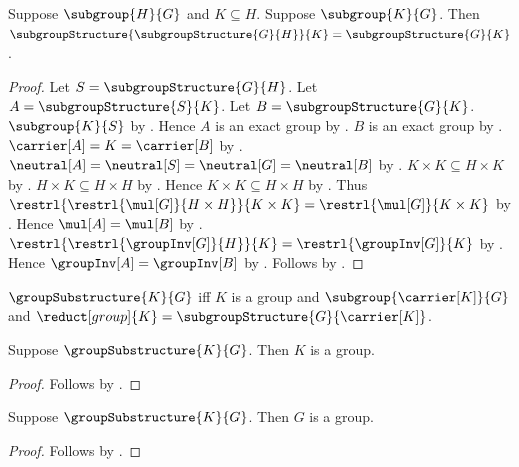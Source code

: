 \begin{theorem}\label{iterated_subgroup_structure}
    Suppose $\subgroup{H}{G}$ and $K\subseteq H$.
    Suppose $\subgroup{K}{G}$.
    Then
        $\subgroupStructure{\subgroupStructure{G}{H}}{K}
            =\subgroupStructure{G}{K}$.
\end{theorem}
\begin{proof}
    Let $S=\subgroupStructure{G}{H}$.
    Let $A=\subgroupStructure{S}{K}$.
    Let $B=\subgroupStructure{G}{K}$.
    $\subgroup{K}{S}$ by .
    Hence $A$ is an exact group by
        .
    $B$ is an exact group by
        .
    $\carrier[A]=K=\carrier[B]$ by
        .
    $\neutral[A]=\neutral[S]=\neutral[G]=\neutral[B]$ by
        .
    $K\times K\subseteq H\times K$ by
        .
    $H\times K\subseteq H\times H$ by
        .
    Hence $K\times K\subseteq H\times H$ by
        .
    Thus
        $\restrl{\restrl{\mul[G]}{H\times H}}{K\times K}
            =\restrl{\mul[G]}{K\times K}$ by
        .
    Hence $\mul[A]=\mul[B]$ by
        .
    $\restrl{\restrl{\groupInv[G]}{H}}{K}
        =\restrl{\groupInv[G]}{K}$ by
        .
    Hence $\groupInv[A]=\groupInv[B]$ by
        .
    Follows by .
\end{proof}

\begin{definition}\label{group_substructure}
    $\groupSubstructure{K}{G}$ iff
        $K$ is a group and
        $\subgroup{\carrier[K]}{G}$ and
        $\reduct[group]{K}
            =\subgroupStructure{G}{\carrier[K]}$.
\end{definition}

\begin{proposition}\label{group_substructure_is_group}
    Suppose $\groupSubstructure{K}{G}$.
    Then $K$ is a group.
\end{proposition}
\begin{proof}
    Follows by .
\end{proof}

\begin{proposition}\label{group_substructure_ambient_group}
    Suppose $\groupSubstructure{K}{G}$.
    Then $G$ is a group.
\end{proposition}
\begin{proof}
    Follows by
        .
\end{proof}

